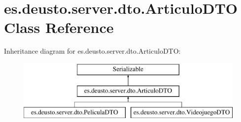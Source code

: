 \hypertarget{classes_1_1deusto_1_1server_1_1dto_1_1_articulo_d_t_o}{}\section{es.\+deusto.\+server.\+dto.\+Articulo\+D\+TO Class Reference}
\label{classes_1_1deusto_1_1server_1_1dto_1_1_articulo_d_t_o}
Inheritance diagram for es.\+deusto.\+server.\+dto.\+Articulo\+D\+TO\+:\begin{figure}[H]
\begin{center}
\leavevmode
\includegraphics[height=3.000000cm]{classes_1_1deusto_1_1server_1_1dto_1_1_articulo_d_t_o}
\end{center}
\end{figure}
